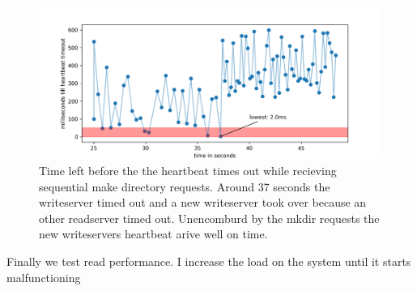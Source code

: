 \begin{figure}[htbp]
	\centering
	\includegraphics{../data/hb_timeout.png}
	\caption{Time left before the the heartbeat times out while recieving sequential make directory requests. Around 37 seconds the writeserver timed out and a new writeserver took over because an other readserver timed out. Unencomburd by the mkdir requests the new writeservers heartbeat arive well on time.}
	\label{fig:hbt}
\end{figure}

Finally we test read performance. I increase the load on the system until it starts malfunctioning
